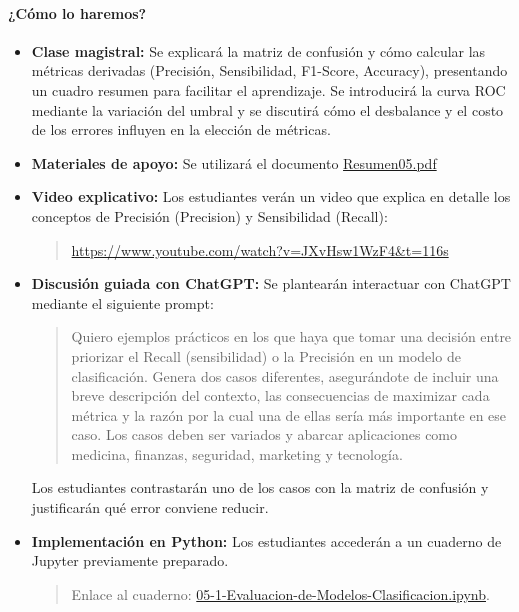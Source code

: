\documentclass[a4,11pt]{aleph-notas}
\begin{document}
\paragraph{¿Cómo lo haremos?}  
\begin{itemize}[leftmargin=*]
    \item \textbf{Clase magistral:}  
    Se explicará la matriz de confusión y cómo calcular las métricas derivadas (Precisión, Sensibilidad, F1-Score, Accuracy), presentando un cuadro resumen para facilitar el aprendizaje.
    Se introducirá la curva ROC mediante la variación del umbral y se discutirá cómo el desbalance y el costo de los errores influyen en la elección de métricas.
    \item \textbf{Materiales de apoyo:} 
    Se utilizará el documento \href{https://andres-merino.github.io/AprendizajeAutomaticoInicial-05-N0105/2-Resumenes/Resumen05.pdf}{Resumen05.pdf}
    
    \item \textbf{Video explicativo:}  
    Los estudiantes verán un video que explica en detalle los conceptos de Precisión (Precision) y Sensibilidad (Recall):
    \begin{quote}
        \url{https://www.youtube.com/watch?v=JXvHsw1WzF4&t=116s}
    \end{quote}
    
    \item \textbf{Discusión guiada con ChatGPT:}  
    Se plantearán interactuar con ChatGPT mediante el siguiente prompt:
    \begin{quote}\small
        Quiero ejemplos prácticos en los que haya que tomar una decisión entre priorizar el Recall (sensibilidad) o la Precisión en un modelo de clasificación. Genera dos casos diferentes, asegurándote de incluir una breve descripción del contexto, las consecuencias de maximizar cada métrica y la razón por la cual una de ellas sería más importante en ese caso. Los casos deben ser variados y abarcar aplicaciones como medicina, finanzas, seguridad, marketing y tecnología.
    \end{quote}
    Los estudiantes contrastarán uno de los casos con la matriz de confusión y justificarán qué error conviene reducir.
    
    \item \textbf{Implementación en Python:} Los estudiantes accederán a un cuaderno de Jupyter previamente preparado.
    \begin{quote}
        Enlace al cuaderno: \href{https://github.com/andres-merino/AprendizajeAutomaticoInicial-05-N0105/blob/main/2-Notebooks/05-1-Evaluacion-de-Modelos-Clasificacion.ipynb}{05-1-Evaluacion-de-Modelos-Clasificacion.ipynb}.
    \end{quote}
    

\end{itemize}
\end{document}
